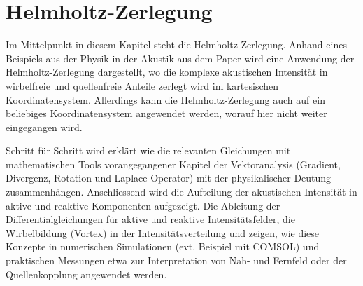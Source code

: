 %
%
%
%
\chapter{Helmholtz-Zerlegung\label{chapter:helmholtz}}
\begin{refsection}

Im Mittelpunkt in diesem Kapitel steht die Helmholtz-Zerlegung.
Anhand eines Beispiels aus der Physik in der Akustik aus dem Paper
\cite{helmholtz:paper}
wird eine Anwendung der Helmholtz-Zerlegung
dargestellt, wo die komplexe akustischen Intensität in wirbelfreie
und quellenfreie Anteile zerlegt wird im kartesischen Koordinatensystem.
Allerdings kann die Helmholtz-Zerlegung auch auf ein beliebiges
Koordinatensystem angewendet werden, worauf hier nicht weiter
eingegangen wird. \newline


Schritt für Schritt wird erklärt wie die relevanten Gleichungen mit mathematischen Tools vorangegangener Kapitel der Vektoranalysis (Gradient, Divergenz, Rotation und Laplace-Operator) mit der physikalischer Deutung zusammenhängen. Anschliessend wird die Aufteilung der akustischen Intensität in aktive und reaktive Komponenten aufgezeigt. Die Ableitung der Differentialgleichungen für aktive und reaktive Intensitätsfelder, die Wirbelbildung (Vortex) in der Intensitätsverteilung und zeigen, wie diese Konzepte in numerischen Simulationen (evt. Beispiel mit COMSOL) und praktischen Messungen etwa zur Interpretation von Nah- und Fernfeld oder der Quellenkopplung angewendet werden.








\printbibliography[heading=subbibliography]
\end{refsection}
